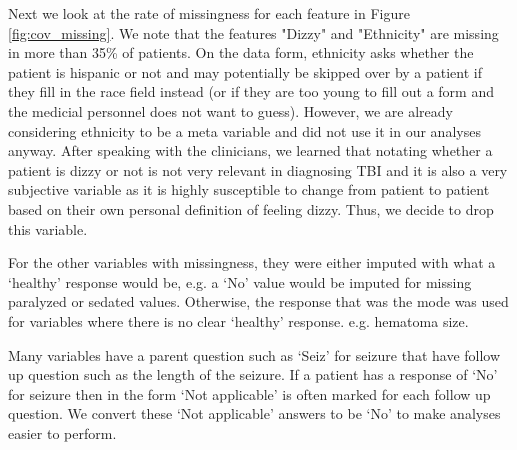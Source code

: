 \documentclass[11pt, letterpaper]{amsart}
\begin{document}
Next we look at the rate of missingness for each feature in Figure \ref{fig:cov_missing}. We note that the features "Dizzy" and "Ethnicity" are missing in more than 35\% of patients. On the data form, ethnicity asks whether the patient is hispanic or not and may potentially be skipped over by a patient if they fill in the race field instead (or if they are too young to fill out a form and the medicial personnel does not want to guess). However, we are already considering ethnicity to be a meta variable and did not use it in our analyses anyway. After speaking with the clinicians, we learned that notating whether a patient is dizzy or not is not very relevant in diagnosing TBI and it is also a very subjective variable as it is highly susceptible to change from patient to patient based on their own personal definition of feeling dizzy. Thus, we decide to drop this variable.

For the other variables with missingness, they were either imputed with what a `healthy' response would be, e.g. a `No' value would be imputed for missing paralyzed or sedated values. Otherwise, the response that was the mode was used for variables where there is no clear `healthy' response. e.g. hematoma size.

Many variables have a parent question such as `Seiz' for seizure that have follow up question such as the length of the seizure. If a patient has a response of `No' for seizure then in the form `Not applicable' is often marked for each follow up question. We convert these `Not applicable' answers to be `No' to make analyses easier to perform.
\end{document}
